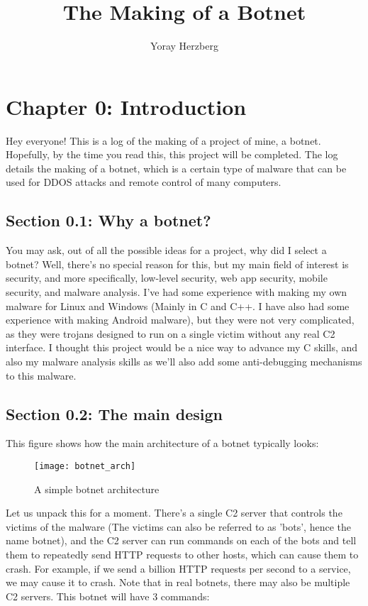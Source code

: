 \documentclass{article}
\title{The Making of a Botnet}
\author{Yoray Herzberg}
\begin{document}
\maketitle

\section{Chapter 0: Introduction}
Hey everyone! This is a log of the making of a project of mine, a botnet. Hopefully, by the time you read this, this project will be completed.  The log details the making of a botnet, which is a certain type of malware that can be used for DDOS attacks and remote control of many computers. 
\subsection{Section 0.1: Why a botnet?}
You may ask, out of all the possible ideas for a project, why did I select a botnet? Well, there's no special reason for this, but my main field of interest is security, and more specifically, low-level security, web app security, mobile security, and malware analysis. I've had some experience with making my own malware for Linux and Windows (Mainly in C and C++. I have also had some experience with making Android malware), but they were not very complicated, as they were trojans designed to run on a single victim without any real C2 interface. I thought this project would be a nice way to advance my C skills, and also my malware analysis skills as we'll also add some anti-debugging mechanisms to this malware. 
\subsection{Section 0.2: The main design}
This figure shows how the main architecture of a botnet typically looks:
\begin{figure}
    \centering
    \texttt{[image: botnet\_arch]}
    \caption{A simple botnet architecture}
    \label{fig:botnet_arch}
\end{figure}

Let us unpack this for a moment. There's a single C2 server that controls the victims of the malware (The victims can also be referred to as 'bots', hence the name botnet), and the C2 server can run commands on each of the bots and tell them to repeatedly send HTTP requests to other hosts, which can cause them to crash. For example, if we send a billion HTTP requests per second to a service, we may cause it to crash. Note that in real botnets, there may also be multiple C2 servers. This botnet will have 3 commands:
\end{document}
